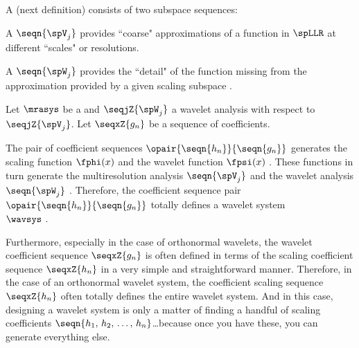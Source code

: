 A  (next definition) consists of two subspace sequences: 
\begin{liste}
  \item A  $\seqn{\spV_j}$ 
     provides ``coarse" approximations of a function in $\spLLR$ at different ``scales" or resolutions.
  \item A  $\seqn{\spW_j}$
     provides the ``detail" of the function missing from the approximation provided by a given scaling subspace
     .
\end{liste}

\begin{definition}
\label{def:wavsys}
\label{def:gn}
Let $\mrasys$ be a  
and $\seqjZ{\spW_j}$ a wavelet analysis 
with respect to $\seqjZ{\spV_j}$.
Let $\seqxZ{g_n}$ be a sequence of coefficients.
\end{definition}

\begin{remark}
The pair of coefficient sequences $\opair{\seqn{h_n}}{\seqn{g_n}}$ generates 
the scaling function $\fphi(x)$  
and the wavelet function $\fpsi(x)$ .
These functions in turn generate 
the multiresolution analysis $\seqn{\spV_j}$ 
and the wavelet analysis $\seqn{\spW_j}$ .
Therefore, the coefficient sequence pair $\opair{\seqn{h_n}}{\seqn{g_n}}$ 
totally defines a wavelet system\\$\wavsys$ .

Furthermore, especially in the case of orthonormal wavelets, the wavelet coefficient
sequence $\seqxZ{g_n}$ is often defined in terms of the 
scaling coefficient sequence $\seqxZ{h_n}$
in a very simple and straightforward manner.
Therefore, in the case of an orthonormal wavelet system, the coefficient
scaling sequence $\seqxZ{h_n}$ often totally defines the entire wavelet system.
And in this case, designing a wavelet system is only a matter of finding a handful of
scaling coefficients $\seqn{h_1,\,h_2,\,\ldots,\,h_n}$\ldots because once you have these,
you can generate everything else.
\end{remark}


